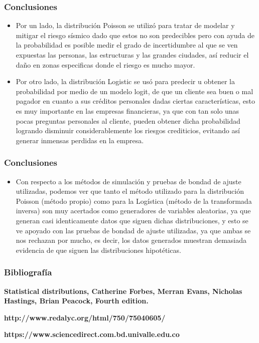 \documentclass[12pt]{beamer}
\begin{document}

\begin{frame}
\frametitle{Conclusiones}
\begin{itemize}
	\item Por un lado, la distribución Poisson se utilizó para tratar de modelar y mitigar el riesgo sísmico dado que estos no son predecibles pero con ayuda de la probabilidad es posible medir el grado de incertidumbre al que se ven expuestas las personas, las estructuras y las grandes ciudades, así reducir el daño en zonas especificas donde el riesgo es mucho mayor. 
	\item Por otro lado, la distribución Logistic se usó para predecir u obtener la probabilidad por medio de un modelo logit, de que un cliente sea buen o mal pagador en cuanto a sus créditos personales dadas ciertas características, esto es muy importante en las empresas financieras, ya que con tan solo unas pocas preguntas personales al cliente, pueden obtener dicha probabilidad logrando disminuir considerablemente los riesgos crediticios, evitando así generar inmensas perdidas en la empresa.
\end{itemize}
\end{frame}

\begin{frame}
\frametitle{Conclusiones}
\begin{itemize}
	\item Con respecto a los métodos de simulación y pruebas de bondad de ajuste utilizadas, podemos ver que tanto el método utilizado para la distribución Poisson (método propio) como para la Logística (método de la transformada inversa) son muy acertados como generadores de variables aleatorias, ya que generan casi identicamente datos que siguen dichas distribuciones, y esto se ve apoyado con las pruebas de bondad de ajuste utilizadas, ya que ambas se nos rechazan por mucho, es decir, los datos generados muestran demasiada evidencia de que siguen las distribuciones hipotéticas.
\end{itemize}
\end{frame}

\begin{frame}
\frametitle{Bibliografía}
\begin{block}{\textbf {Statistical distributions, Catherine Forbes, Merran Evans, Nicholas Hastings, Brian Peacock, Fourth edition.}}
\end{block}	
\begin{block}{\textbf {http://www.redalyc.org/html/750/75040605/}}
\end{block}
\begin{block}{\textbf {https://www.sciencedirect.com.bd.univalle.edu.co}}
\end{block}
\end{frame}
\end{document}
